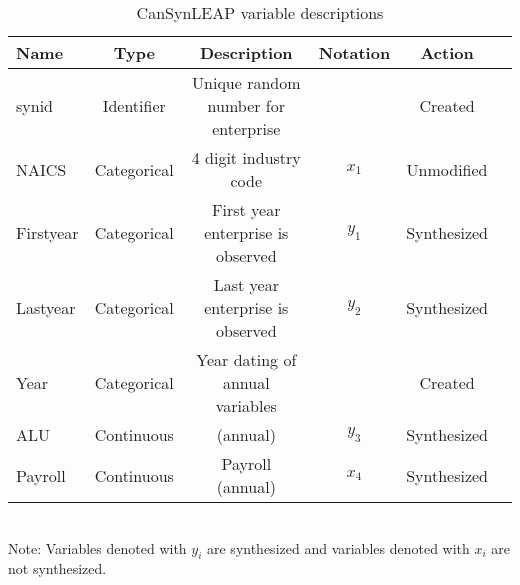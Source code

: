 \begin{table}[H]
  \centering\footnotesize
  \caption{CanSynLEAP variable descriptions}  \label{tab:LEAP_Variable} \medskip
  \renewcommand{\arraystretch}{1}
  \begin{tabular}{l  c c c c c}
    \toprule
    \textbf{Name}&\textbf{Type}&\textbf{Description}&\textbf{Notation}&\textbf{Action}\\
    \midrule
synid&Identifier&Unique random number for enterprise&&Created\\
NAICS&Categorical&4 digit industry code&$x_{1}$&Unmodified\\
Firstyear&Categorical&First year enterprise is observed &$y_{1}$&Synthesized\\
Lastyear&Categorical&Last year enterprise is observed &$y_{2}$&Synthesized\\
Year&Categorical&Year dating of annual variables&&Created\\
ALU&Continuous&(annual)&$y_{3}$&Synthesized\\
Payroll&Continuous&Payroll (annual)&$x_{4}$&Synthesized\\
   \bottomrule
  \end{tabular} 
\\
Note: Variables denoted with $y_{i}$ are synthesized and variables denoted with $x_{i}$ are not synthesized. 
\end{table}